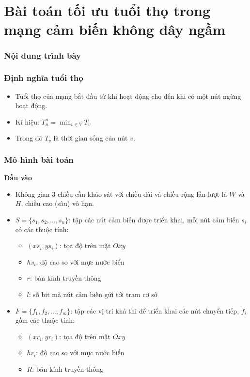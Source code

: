 \section{Bài toán tối ưu tuổi thọ trong mạng cảm biến không dây ngầm}
\begin{frame}[noframenumbering]
    \frametitle{Nội dung trình bày}
    \tableofcontents[currentsection]
\end{frame}

\begin{frame}
    \frametitle{Định nghĩa tuổi thọ}
    \begin{itemize}
        \item Tuổi thọ của mạng bắt đầu từ khi hoạt động cho đến khi có một nút ngừng hoạt động.
        \item Kí hiệu: $T_n^n = \min_{v \in V} T_v$
        \item[] Trong đó $T_v$ là thời gian sống của nút $v$.
    \end{itemize}
\end{frame}

\begin{frame}
    \frametitle{Mô hình bài toán}
    \textbf{Đầu vào }
    \begin{itemize}
        \item Không gian 3 chiều cần khảo sát với chiều dài và chiều rộng lần lượt là $W$ và $H$, chiều cao (sâu) vô hạn.
        \item $S = \{s_1, s_2,…, s_n\}$: tập các nút cảm biến được triển khai, mỗi nút cảm biến $s_i$ có các thuộc tính:
        \begin{itemize}
            \item[] $(xs_i, ys_i)$: tọa độ trên mặt $Oxy$
            \item[] $hs_i$: độ cao so với mực nước biển
            \item[] $r$: bán kính truyền thông 
            \item[] $l$: số bit mà nút cảm biến gửi tới trạm cơ sở
        \end{itemize}
        \item $F = \{f_1, f_2,…, f_m\}$: tập các vị trí khả thi để triển khai các nút chuyển tiếp, $f_i$ gồm các thuộc tính:
        \begin{itemize}
            \item[] $(xr_i, yr_i)$: tọa độ trên mặt $Oxy$
            \item[] $hr_i$: độ cao so với mực nước biển
            \item[] $R$: bán kính truyền thông 
        \end{itemize}
    \end{itemize}
\end{frame}

